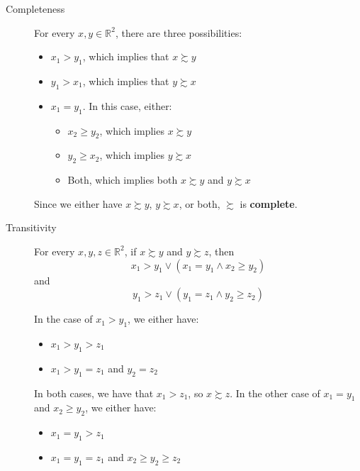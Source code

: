 \documentclass[12pt]{extarticle}
\numberwithin{table}{section}
\numberwithin{figure}{section}
\numberwithin{equation}{section}
\begin{document}
\begin{description}
    \item[Completeness]
          For every $x, y \in \mathbb{R}^2$, there are three possibilities:
          \begin{itemize}
              \item $x_1 > y_1$, which implies that $x \succsim y$
              \item $y_1 > x_1$, which implies that $y \succsim x$
              \item $x_1 = y_1$. In this case, either:
                    \begin{itemize}
                        \item $x_2 \ge y_2$, which implies $x \succsim y$
                        \item $y_2 \ge x_2$, which implies $y \succsim x$
                        \item Both, which implies both $x \succsim y$ and $y \succsim x$
                    \end{itemize}
          \end{itemize}
          Since we either have $x \succsim y$, $y \succsim x$, or both, $\succsim$ is \textbf{complete}.
    \item[Transitivity]
          For every $x, y, z \in \mathbb{R}^2$, if $x \succsim y$ and $y \succsim z$, then
          \begin{equation}
              x_1 > y_1 \lor (x_1 = y_1 \land x_2 \ge y_2)
          \end{equation}
          and
          \begin{equation}
              y_1 > z_1 \lor (y_1 = z_1 \land y_2 \ge z_2)
          \end{equation}

          In the case of $x_1 > y_1$, we either have:
          \begin{itemize}
              \item $x_1 > y_1 > z_1$
              \item $x_1 > y_1 = z_1$ and $y_2 = z_2$
          \end{itemize}

          In both cases, we have that $x_1 > z_1$, so $x \succsim z$.
          In the other case of $x_1 = y_1$ and $x_2 \ge y_2$, we either have:
          \begin{itemize}
              \item $x_1 = y_1 > z_1$
              \item $x_1 = y_1 = z_1$ and $x_2 \ge y_2 \ge z_2$
          \end{itemize}


\end{description}
\end{document}
